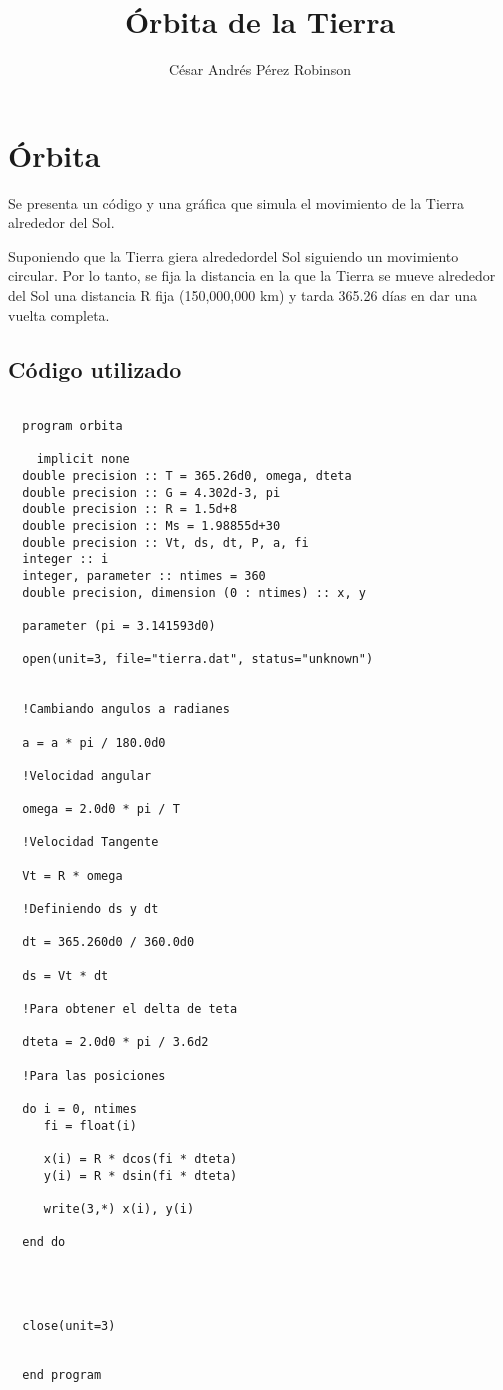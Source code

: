 \documentclass{article}
\title{Órbita de la Tierra}
\author{César Andrés Pérez Robinson}
\begin{document}
\maketitle

\section{Órbita}
Se presenta un código y una gráfica que simula el movimiento de la Tierra alrededor del Sol.

Suponiendo que la Tierra giera alrededordel Sol siguiendo un movimiento circular. Por lo tanto, se fija la distancia en la que la Tierra se mueve alrededor del Sol una distancia R fija (150,000,000 km) y tarda 365.26 días en dar una vuelta completa.

\subsection{Código utilizado}
\begin{verbatim}

  program orbita

    implicit none
  double precision :: T = 365.26d0, omega, dteta 
  double precision :: G = 4.302d-3, pi
  double precision :: R = 1.5d+8
  double precision :: Ms = 1.98855d+30
  double precision :: Vt, ds, dt, P, a, fi
  integer :: i
  integer, parameter :: ntimes = 360
  double precision, dimension (0 : ntimes) :: x, y
  
  parameter (pi = 3.141593d0)

  open(unit=3, file="tierra.dat", status="unknown")
  

  !Cambiando angulos a radianes
  
  a = a * pi / 180.0d0

  !Velocidad angular

  omega = 2.0d0 * pi / T

  !Velocidad Tangente

  Vt = R * omega

  !Definiendo ds y dt
  
  dt = 365.260d0 / 360.0d0

  ds = Vt * dt

  !Para obtener el delta de teta

  dteta = 2.0d0 * pi / 3.6d2

  !Para las posiciones

  do i = 0, ntimes
     fi = float(i)

     x(i) = R * dcos(fi * dteta)
     y(i) = R * dsin(fi * dteta)

     write(3,*) x(i), y(i)

  end do
  

  

  close(unit=3)

  
  end program
\end{verbatim}
\end{document}
